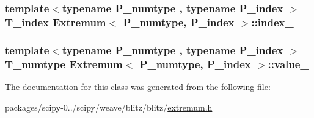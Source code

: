 \subsubsection[{index\+\_\+}]{\setlength{\rightskip}{0pt plus 5cm}template$<$typename P\+\_\+numtype , typename P\+\_\+index $>$ {\bf T\+\_\+index} {\bf Extremum}$<$ P\+\_\+numtype, P\+\_\+index $>$\+::index\+\_\+\hspace{0.3cm}{\ttfamily [protected]}}\label{classExtremum_ad8c76332d27149d8550b463d710c55a5}
\hypertarget{classExtremum_a85c3dcbf818d0ac6d587907fa250c84e}{}
\subsubsection[{value\+\_\+}]{\setlength{\rightskip}{0pt plus 5cm}template$<$typename P\+\_\+numtype , typename P\+\_\+index $>$ {\bf T\+\_\+numtype} {\bf Extremum}$<$ P\+\_\+numtype, P\+\_\+index $>$\+::value\+\_\+\hspace{0.3cm}{\ttfamily [protected]}}\label{classExtremum_a85c3dcbf818d0ac6d587907fa250c84e}


The documentation for this class was generated from the following file\+:\begin{DoxyCompactItemize}
\item 
packages/scipy-\/0../scipy/weave/blitz/blitz/\hyperlink{extremum_8h}{extremum.\+h}\end{DoxyCompactItemize}
